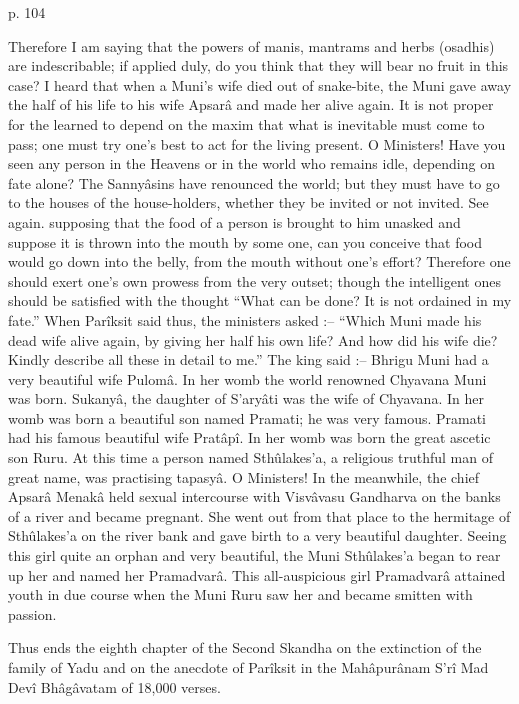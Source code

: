  

p. 104

 

Therefore I am saying that the powers of manis, mantrams and herbs (osadhis) are indescribable; if applied duly, do you think that they will bear no fruit in this case? I heard that when a Muni's wife died out of snake-bite, the Muni gave away the half of his life to his wife Apsarâ and made her alive again. It is not proper for the learned to depend on the maxim that what is inevitable must come to pass; one must try one's best to act for the living present. O Ministers! Have you seen any person in the Heavens or in the world who remains idle, depending on fate alone? The Sannyâsins have renounced the world; but they must have to go to the houses of the house-holders, whether they be invited or not invited. See again. supposing that the food of a person is brought to him unasked and suppose it is thrown into the mouth by some one, can you conceive that food would go down into the belly, from the mouth without one's effort? Therefore one should exert one's own prowess from the very outset; though the intelligent ones should be satisfied with the thought “What can be done? It is not ordained in my fate.” When Parîksit said thus, the ministers asked :-- “Which Muni made his dead wife alive again, by giving her half his own life? And how did his wife die? Kindly describe all these in detail to me.” The king said :-- Bhrigu Muni had a very beautiful wife Pulomâ. In her womb the world renowned Chyavana Muni was born. Sukanyâ, the daughter of S’aryâti was the wife of Chyavana. In her womb was born a beautiful son named Pramati; he was very famous. Pramati had his famous beautiful wife Pratâpî. In her womb was born the great ascetic son Ruru. At this time a person named Sthûlakes'a, a religious truthful man of great name, was practising tapasyâ. O Ministers! In the meanwhile, the chief Apsarâ Menakâ held sexual intercourse with Visvâvasu Gandharva on the banks of a river and became pregnant. She went out from that place to the hermitage of Sthûlakes'a on the river bank and gave birth to a very beautiful daughter. Seeing this girl quite an orphan and very beautiful, the Muni Sthûlakes'a began to rear up her and named her Pramadvarâ. This all-auspicious girl Pramadvarâ attained youth in due course when the Muni Ruru saw her and became smitten with passion.

 

Thus ends the eighth chapter of the Second Skandha on the extinction of the family of Yadu and on the anecdote of Parîksit in the Mahâpurânam S’rî Mad Devî Bhâgâvatam of 18,000 verses.